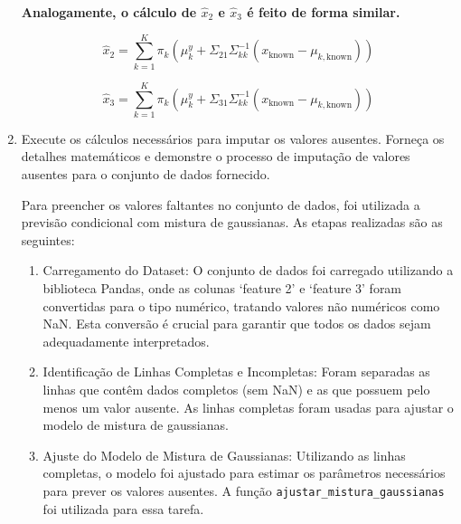 \begin{enumerate}
\begin{tcolorbox}[colback=white, colframe=black, title=Previsão da Feature Faltante]
    

\end{tcolorbox}


\begin{tcolorbox}[colback=white, colframe=black, title=Reposta(continuação):]

    \textbf{Analogamente, o cálculo de \(\hat{x}_2\) e \(\hat{x}_3\) é feito de forma similar.}

    \[
    \hat{x}_2 = \sum_{k=1}^{K} \pi_k \left( \mu_k^y + \Sigma_{21} \Sigma_{kk}^{-1}(x_{\text{known}} - \mu_{k,\text{known}}) \right)
    \]

    \[
    \hat{x}_3 = \sum_{k=1}^{K} \pi_k \left( \mu_k^y + \Sigma_{31} \Sigma_{kk}^{-1}(x_{\text{known}} - \mu_{k,\text{known}}) \right)
    \]

\end{tcolorbox}



\item Execute os cálculos necessários para imputar os valores ausentes. Forneça os detalhes matemáticos e demonstre o processo de imputação de valores ausentes para o conjunto de dados fornecido.

\begin{tcolorbox}[colback=white, colframe=black, title=Resposta:]

    Para preencher os valores faltantes no conjunto de dados, foi utilizada a previsão condicional com mistura de gaussianas. As etapas realizadas são as seguintes:
    
    \begin{enumerate}
        \item Carregamento do Dataset: O conjunto de dados foi carregado utilizando a biblioteca Pandas, onde as colunas `feature 2' e `feature 3' foram convertidas para o tipo numérico, tratando valores não numéricos como NaN. Esta conversão é crucial para garantir que todos os dados sejam adequadamente interpretados.
    
        \item Identificação de Linhas Completas e Incompletas: Foram separadas as linhas que contêm dados completos (sem NaN) e as que possuem pelo menos um valor ausente. As linhas completas foram usadas para ajustar o modelo de mistura de gaussianas.
    
        \item Ajuste do Modelo de Mistura de Gaussianas: Utilizando as linhas completas, o modelo foi ajustado para estimar os parâmetros necessários para prever os valores ausentes. A função \texttt{ajustar\_mistura\_gaussianas} foi utilizada para essa tarefa.
    

\end{enumerate}
\end{tcolorbox}
\end{enumerate}
